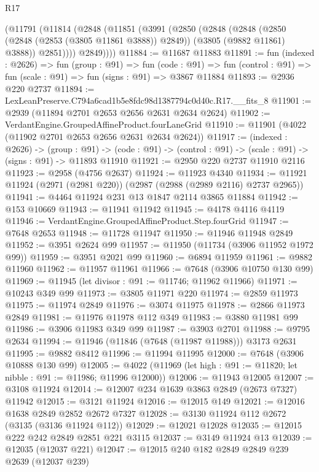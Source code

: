 \begin{lexlean}{R17}
\begin{coremodule}
      (@11791
        (@11814
          (@2848
            (@11851
              (@3991
                (@2850
                  (@2848
                    (@2848
                      (@2850 (@2848 (@2853 (@3805 @11861 @3888)) @2849))
                      (@3805 (@9882 @11861) @3888))
                    @2851))))
            @2849))))
@11884 := @11687 @11883
@11891 := fun (indexed : @2626) =>
  fun (group : @91) =>
  fun (code : @91) => fun (control : @91) => fun (scale : @91) => fun (signs : @91) => @3867 @11884
@11893 := @2936 @220 @2737
@11894 := LexLeanPreserve.C794a6cad1b5e8fdc98d1387794c0d40c.R17.__fits_8
@11901 := @2939 (@11894 @2701 @2653 @2656 @2631 @2634 @2624)
@11902 := VerdantEngine.GroupedAffineProduct.fourLaneGrid
@11910 := @11901 (@4022 (@11902 @2701 @2653 @2656 @2631 @2634 @2624))
@11917 := (indexed : @2626) ->
  (group : @91) ->
  (code : @91) -> (control : @91) -> (scale : @91) -> (signs : @91) -> @11893 @11910
@11921 := @2950 @220 @2737 @11910 @2116
@11923 := @2958 (@4756 @2637)
@11924 := @11923 @4340
@11934 := @11921 @11924 (@2971 (@2981 @220)) (@2987 (@2988 (@2989 @2116) @2737 @2965))
@11941 := @4464 @11924 @231 @13 @1847 @2114 @3865 @11884
@11942 := @153 @10669
@11943 := @11941 @11942
@11945 := @4178 @4116 @4119
@11946 := VerdantEngine.GroupedAffineProduct.Step.fourGrid
@11947 := @7648 @2653
@11948 := @11728 @11947
@11950 := @11946 @11948 @2849
@11952 := @3951 @2624 @99
@11957 := @11950 (@11734 (@3906 @11952 @1972 @99))
@11959 := @3951 @2021 @99
@11960 := @6894 @11959
@11961 := @9882 @11960
@11962 := @11957 @11961
@11966 := @7648 (@3906 @10750 @130 @99)
@11969 := @11945 (let divisor : @91 := @11746; @11962 @11966)
@11971 := @10243 @349 @99
@11973 := @3805 @11971 @220
@11974 := @2859 @11973
@11975 := @11974 @2849
@11976 := @3074 @11975
@11978 := @2866 @11973 @2849
@11981 := @11976 @11978 @112 @349
@11983 := @3880 @11981 @99
@11986 := @3906 @11983 @349 @99
@11987 := @3903 @2701
@11988 := @9795 @2634
@11994 := @11946 (@11846 (@7648 (@11987 @11988))) @3173 @2631
@11995 := @9882 @8412
@11996 := @11994 @11995
@12000 := @7648 (@3906 @10888 @130 @99)
@12005 := @4022 (@11969 (let high : @91 := @11820; let nibble : @91 := @11986; @11996 @12000))
@12006 := @11943 @12005
@12007 := @3108 @11924
@12014 := @12007 @234 @1639 @3863 @2849 (@2673 @7327) @11942
@12015 := @3121 @11924
@12016 := @12015 @149
@12021 := @12016 @1638 @2849 @2852 @2672 @7327
@12028 := @3130 @11924 @112 @2672 (@3135 (@3136 @11924 @112))
@12029 := @12021 @12028
@12035 := @12015 @222 @242 @2849 @2851 @221 @3115
@12037 := @3149 @11924 @13
@12039 := @12035 (@12037 @221)
@12047 := @12015 @240 @182 @2849 @2849 @239 @2639 (@12037 @239)

\end{coremodule}
\end{lexlean}
